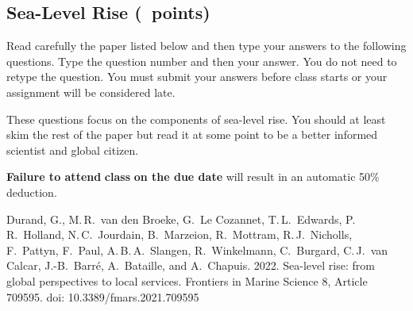 \documentclass[12pt, addpoints]{exam}
\begin{document}
\subsection*{Sea-Level Rise (\numpoints\ points)}

Read carefully the paper listed below and then type your answers to the 
following questions. Type the question number and then your answer. You 
do not need to retype the question. You must submit your answers before 
class starts or your assignment will be considered late. 

These questions focus on the components of sea-level rise. You should at
least skim the rest of the paper but read it at some point to be a 
better informed scientist and global citizen.

\textbf{Failure to attend} \textbf{class} \textbf{on the due date} will
result in an automatic 50\% deduction.

\begin{hangparas}{1.5em}{1}
Durand, G., M.\,R.\ van den Broeke, G.\ Le Cozannet, T.\,L.\ Edwards, P.\,R.\ Holland, N.\,C.\ Jourdain, B.\ Marzeion, R.\ Mottram, R.\,J.\ Nicholls, F.\ Pattyn, F.\ Paul, A.\,B.\,A.\ Slangen, R.\ Winkelmann, C.\ Burgard, C.\,J.\ van Calcar, J.-B.\ Barré, A.\ Bataille, and A.\ Chapuis.
2022. Sea-level rise: from global perspectives to local services. Frontiers in Marine Science 8, Article 709595. doi: 10.3389/fmars.2021.709595 
\end{hangparas}
\end{document}

